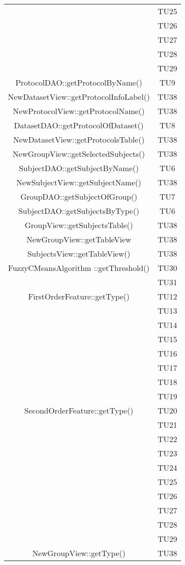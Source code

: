\begin{center}
\begin{longtable}{|c|c|}
 & TU25 \\
 & TU26 \\
 & TU27 \\
 & TU28 \\
 & TU29 \\
\hline 
ProtocolDAO::getProtocolByName() & TU9 \\
\hline 
NewDatasetView::getProtocolInfoLabel() & TU38 \\
\hline 
NewProtocolView::getProtocolName() & TU38 \\
\hline 
DatasetDAO::getProtocolOfDataset() & TU8 \\
\hline 
NewDatasetView::getProtocolsTable() & TU38 \\
\hline 
NewGroupView::getSelectedSubjects() & TU38 \\
\hline 
SubjectDAO::getSubjectByName() & TU6 \\
\hline 
NewSubjectView::getSubjectName() & TU38 \\
\hline 
GroupDAO::getSubjectOfGroup() & TU7 \\
\hline 
SubjectDAO::getSubjectsByType() & TU6 \\
\hline 
GroupView::getSubjectsTable() & TU38 \\
\hline 
NewGroupView::getTableView & TU38 \\
\hline 
SubjectsView::getTableView() & TU38 \\
\hline 
FuzzyCMeansAlgorithm ::getThreshold() & TU30 \\
 & TU31 \\
\hline 
FirstOrderFeature::getType() & TU12 \\
 & TU13 \\
 & TU14 \\
 & TU15 \\
 & TU16 \\
 & TU17 \\
 & TU18 \\
 & TU19 \\
\hline 
SecondOrderFeature::getType() & TU20 \\
 & TU21 \\
 & TU22 \\
 & TU23 \\
 & TU24 \\
 & TU25 \\
 & TU26 \\
 & TU27 \\
 & TU28 \\
 & TU29 \\
\hline 
NewGroupView::getType() & TU38 \\

\end{longtable}
\end{center}

